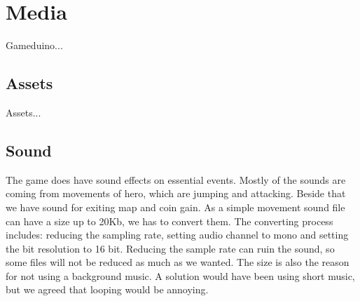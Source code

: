 \section{Media}
Gameduino...

\subsection{Assets}
Assets...

\subsection{Sound} %
The game does have sound effects on essential events. Mostly of the sounds are coming from movements of hero, which are jumping and attacking. Beside that we have sound for exiting map and coin gain. As a simple movement sound file can have a size up to 20Kb, we has to convert them. The converting process includes: reducing the sampling rate, setting audio channel to mono and setting the bit resolution to 16 bit. Reducing the sample rate can ruin the sound, so some files will not be reduced as much as we wanted. The size is also the reason for not using a background music. A solution would have been using short music, but we agreed that looping would be annoying.

